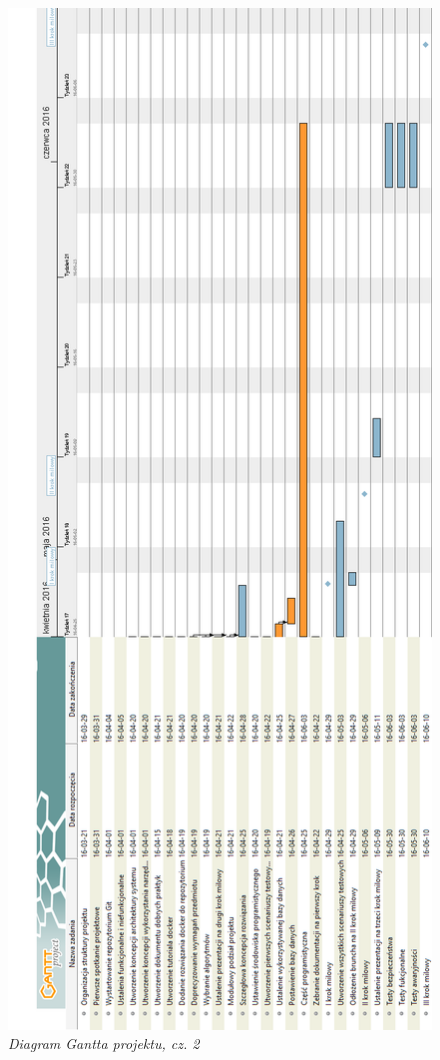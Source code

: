 \begin{figure}[!h]
    \begin{center}
    \includegraphics[angle=0,scale=0.4]{img/gantt2.png}
    \end{center}
    \caption{\em Diagram Gantta projektu, cz. 2}
    \label{fig:g2}
\end{figure}